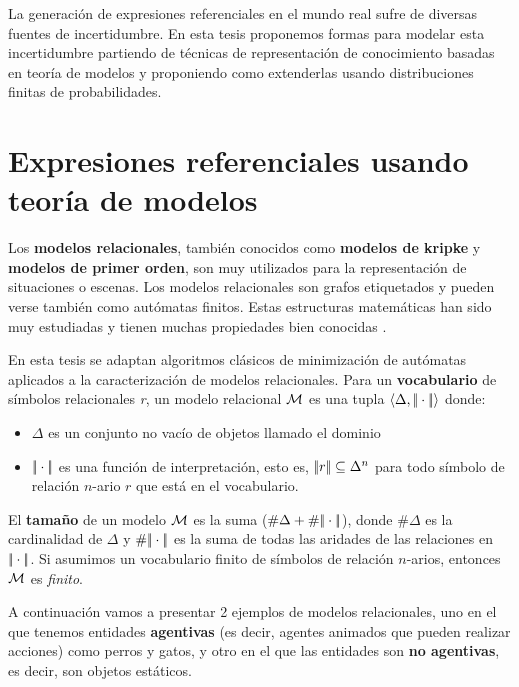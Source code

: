 La generaci\'on de expresiones referenciales en el mundo real sufre de diversas fuentes de incertidumbre. En esta tesis proponemos formas para modelar esta incertidumbre partiendo de t\'ecnicas de representaci\'on de conocimiento basadas en teor\'ia de modelos y proponiendo como extenderlas usando distribuciones finitas de probabilidades.

\section{Expresiones referenciales usando teor\'ia de modelos}
\label{sec:gre-teoria-modelos}

Los \textbf{modelos relacionales}, tambi\'en conocidos como \textbf{modelos de kripke} y \textbf{modelos de primer orden}, son muy utilizados para la representaci\'on de situaciones o escenas. 
Los modelos relacionales son grafos etiquetados y pueden verse
tambi\'en como aut\'omatas finitos. Estas estructuras matem\'aticas
han sido muy estudiadas y tienen muchas propiedades bien conocidas
\cite{arec:hybr05b}. 

En esta tesis se adaptan algoritmos cl\'asicos de minimizaci\'on de aut\'omatas aplicados a la caracterizaci\'on de modelos relacionales. Para un \textbf{vocabulario} de s\'imbolos relacionales \emph{r}, un modelo relacional $\mathcal{M}$ es una tupla $\langle \Delta,|\!|\cdot|\!| \rangle$ donde:

\begin{itemize}
 \item $\Delta$ es un conjunto no vac\'io de objetos llamado el dominio
 \item $|\!|\cdot|\!|$ es una funci\'on de interpretaci\'on, esto es, $|\!|r|\!| \subseteq \Delta^n$ para todo s\'imbolo de relaci\'on $n$-ario $r$ que est\'a en el vocabulario.  
\end{itemize}

El \textbf{tama\~no} de un modelo $\mathcal{M}$ es la suma ($\#\Delta + \#|\!|\cdot|\!|$), donde $\#\Delta$ es la cardinalidad
de $\Delta$ y $\#|\!|\cdot|\!|$ es la suma de todas las aridades de las relaciones en $|\!|\cdot|\!|$.
Si asumimos un vocabulario finito de s\'imbolos de relaci\'on $n$-arios, entonces $\mathcal{M}$ es \emph{finito}. 

A continuaci\'on vamos a presentar 2 ejemplos de modelos relacionales, uno en el que tenemos entidades \textbf{agentivas} (es decir, agentes animados que pueden realizar acciones) como perros y gatos, y otro en el que las entidades son \textbf{no agentivas}, es decir, son objetos est\'aticos.

